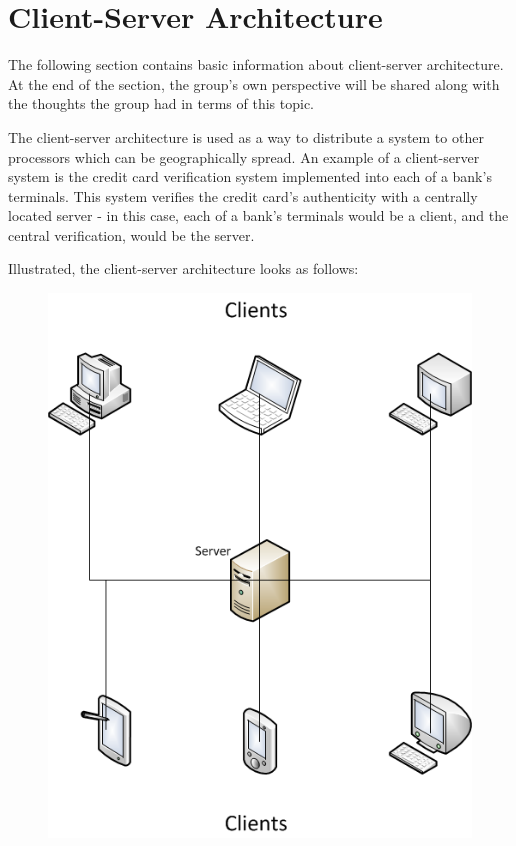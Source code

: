 \section{Client-Server Architecture}

The following section contains basic information about client-server architecture. At the 
end of the section, the group's own perspective will be shared along with the thoughts the 
group had in terms of this topic.

The client-server architecture is used as a way to distribute a system to other processors
which can be geographically spread\cite{ooad01}. An example of a client-server system is the 
credit card verification system implemented into each of a bank's terminals. This system 
verifies the credit card's authenticity with a centrally located server - in this case, each 
of a bank's terminals would be a client, and the central verification, would be the 
server\cite{ooad01}.

Illustrated, the client-server architecture looks as follows:

\begin{figure}[ht]
	\centering
		\includegraphics[scale=0.50]{design/figures/client-server.png}
	\label{fig:client-server architecture}
\end{figure}

